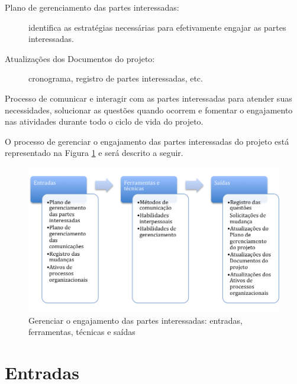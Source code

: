 \begin{description}

	\item[Plano de gerenciamento das partes interessadas:] identifica as estratégias necessárias para efetivamente engajar as partes interessadas.
	
	\item[Atualizações dos Documentos do projeto:] cronograma, registro de partes interessadas, etc.
	
\end{description}

Processo de comunicar e interagir com as partes interessadas para atender suas necessidades, solucionar as questões quando ocorrem e fomentar o engajamento nas atividades durante todo o ciclo de vida do projeto.

O processo de gerenciar o engajamento das partes interessadas do projeto está representado na Figura \ref{fig:sh:engaja:ger:efts} e será descrito a seguir.

\begin{figure}[!h]
	\centering
	\includegraphics[scale=0.5]{Figuras/stakeholders_efts_ger_engaja.png}
	\caption{Gerenciar o engajamento das partes interessadas: entradas, ferramentas, técnicas e saídas}
	\label{fig:sh:engaja:ger:efts}
\end{figure}

\section{Entradas}

